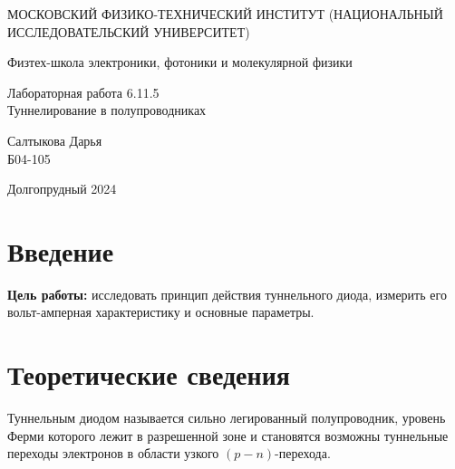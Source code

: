 \documentclass[a4paper,12pt]{article} %
\begin{document}
	
	\begin{titlepage}
	\begin{center}
		{\large МОСКОВСКИЙ ФИЗИКО-ТЕХНИЧЕСКИЙ ИНСТИТУТ (НАЦИОНАЛЬНЫЙ ИССЛЕДОВАТЕЛЬСКИЙ УНИВЕРСИТЕТ)}
	\end{center}
	\begin{center}
		{\large Физтех-школа электроники, фотоники и молекулярной физики}
	\end{center}
	
	
	\vspace{4.5cm}
	{\huge
		\begin{center}
			{Лабораторная работа 6.11.5}\\
			Туннелирование в полупроводниках
		\end{center}
	}
	\vspace{2cm}
	\begin{flushright}
		{\LARGE Салтыкова Дарья \\
			\vspace{0.5cm}
			Б04-105}
	\end{flushright}
	\vspace{8cm}
	\begin{center}
		Долгопрудный 2024
	\end{center}
\end{titlepage}

\section{Введение}

\noindent \textbf{Цель работы:} исследовать принцип действия туннельного диода, измерить его вольт-амперная характеристику и основные параметры. 
\medskip
	 
	

\section{Теоретические сведения}
	
Туннельным диодом называется сильно легированный полупроводник, уровень Ферми которого лежит в разрешенной зоне и становятся возможны туннельные переходы электронов в области узкого $(p-n)$-перехода. 
	
\end{document}
